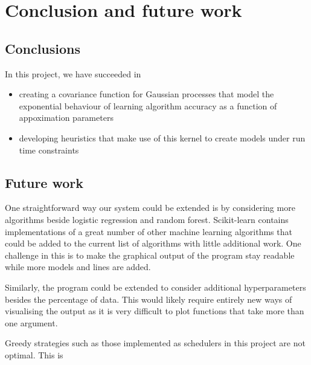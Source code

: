\documentclass[a4paper,12pt,twoside,openright]{report}
\begin{document}


\chapter{Conclusion and future work} 
\section{Conclusions}
In this project, we have succeeded in
\begin{itemize}
	\item creating a covariance function for Gaussian processes that model the exponential behaviour of learning algorithm accuracy as a function of appoximation parameters
	\item developing heuristics that make use of this kernel to create models under run time constraints
\end{itemize}


\section{Future work}
One straightforward way our system could be extended is by considering more algorithms beside logistic regression and random forest. Scikit-learn contains implementations of a great number of other machine learning algorithms that could be added to the current list of algorithms with little additional work. One challenge in this is to make the graphical output of the program stay readable while more models and lines are added.

Similarly, the program could be extended to consider additional hyperparameters besides the percentage of data. This would likely require entirely new ways of visualising the output as it is very difficult to plot functions that take more than one argument.

Greedy strategies such as those implemented as schedulers in this project are not optimal. This is 





\appendix
\singlespacing


 

\end{document}

